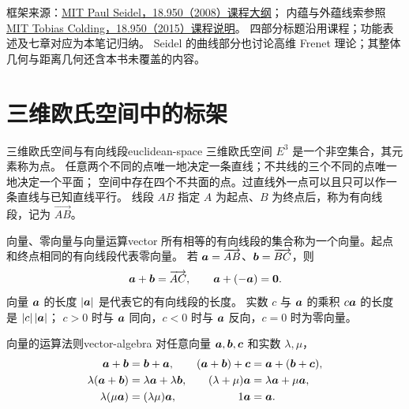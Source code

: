 \smallskip
\begingroup
\footnotesize\noindent
框架来源：\href{https://ocw.mit.edu/courses/18-950-differential-geometry-fall-2008/pages/syllabus/}{MIT Paul Seidel，18.950（2008）课程大纲}；
内蕴与外蕴线索参照\href{https://math.mit.edu/classes/18.950/2015sp/index.html}{MIT Tobias Colding，18.950（2015）课程说明}。
四部分标题沿用课程；功能表述及七章对应为本笔记归纳。
Seidel 的曲线部分也讨论高维 Frenet 理论；其整体几何与距离几何还含本书未覆盖的内容。
\par\endgroup

\clearpage

\section{三维欧氏空间中的标架}

\begin{definition}{三维欧氏空间与有向线段}{euclidean-space}
三维欧氏空间 $E^3$ 是一个非空集合，其元素称为点。
任意两个不同的点唯一地决定一条直线；不共线的三个不同的点唯一地决定一个平面；
空间中存在四个不共面的点。过直线外一点可以且只可以作一条直线与已知直线平行。
线段 $AB$ 指定 $A$ 为起点、$B$ 为终点后，称为有向线段，记为 $\overrightarrow{AB}$。
\end{definition}

\begin{definition}{向量、零向量与向量运算}{vector}
所有相等的有向线段的集合称为一个向量。起点和终点相同的有向线段代表零向量。
若 $\boldsymbol{a}=\overrightarrow{AB}$、$\boldsymbol{b}=\overrightarrow{BC}$，则
\[
\boldsymbol{a}+\boldsymbol{b}=\overrightarrow{AC},\qquad
\boldsymbol{a}+(-\boldsymbol{a})=\boldsymbol{0}.
\]
向量 $\boldsymbol{a}$ 的长度 $|\boldsymbol{a}|$ 是代表它的有向线段的长度。
实数 $c$ 与 $\boldsymbol{a}$ 的乘积 $c\boldsymbol{a}$ 的长度是 $|c|\,|\boldsymbol{a}|$；
$c>0$ 时与 $\boldsymbol{a}$ 同向，$c<0$ 时与 $\boldsymbol{a}$ 反向，$c=0$ 时为零向量。
\end{definition}

\begin{proposition}{向量的运算法则}{vector-algebra}
对任意向量 $\boldsymbol{a},\boldsymbol{b},\boldsymbol{c}$ 和实数 $\lambda,\mu$，
\[
\begin{aligned}
\boldsymbol{a}+\boldsymbol{b}&=\boldsymbol{b}+\boldsymbol{a},&
(\boldsymbol{a}+\boldsymbol{b})+\boldsymbol{c}&=\boldsymbol{a}+(\boldsymbol{b}+\boldsymbol{c}),\\
\lambda(\boldsymbol{a}+\boldsymbol{b})&=\lambda\boldsymbol{a}+\lambda\boldsymbol{b},&
(\lambda+\mu)\boldsymbol{a}&=\lambda\boldsymbol{a}+\mu\boldsymbol{a},\\
\lambda(\mu\boldsymbol{a})&=(\lambda\mu)\boldsymbol{a},&1\boldsymbol{a}&=\boldsymbol{a}.
\end{aligned}
\]
\end{proposition}

